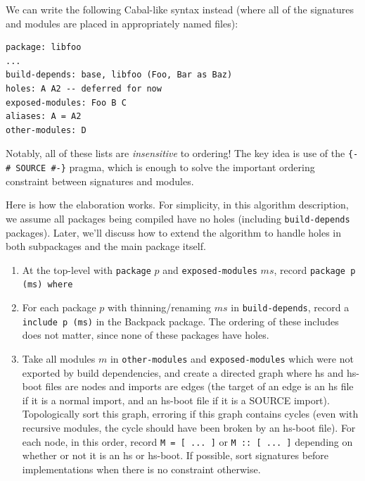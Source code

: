 \documentclass{article}
\begin{document}
We can write the following Cabal-like syntax instead (where
all of the signatures and modules are placed in appropriately
named files):

\begin{verbatim}
package: libfoo
...
build-depends: base, libfoo (Foo, Bar as Baz)
holes: A A2 -- deferred for now
exposed-modules: Foo B C
aliases: A = A2
other-modules: D
\end{verbatim}

Notably, all of these lists are \emph{insensitive} to ordering!
The key idea is use of the \verb|{-# SOURCE #-}| pragma, which
is enough to solve the important ordering constraint between
signatures and modules.

Here is how the elaboration works.  For simplicity, in this algorithm
description, we assume all packages being compiled have no holes
(including \verb|build-depends| packages). Later, we'll discuss how to
extend the algorithm to handle holes in both subpackages and the main
package itself.

\begin{enumerate}

    \item At the top-level with \verb|package| $p$ and
        \verb|exposed-modules| $ms$, record \verb|package p (ms) where|

    \item For each package $p$ with thinning/renaming $ms$ in
        \verb|build-depends|, record a \verb|include p (ms)| in the
        Backpack package.  The ordering of these includes does not
        matter, since none of these packages have holes.

    \item Take all modules $m$ in \verb|other-modules| and
        \verb|exposed-modules| which were not exported by build
        dependencies, and create a directed graph where hs and hs-boot
        files are nodes and imports are edges (the target of an edge is
        an hs file if it is a normal import, and an hs-boot file if it
        is a SOURCE import).  Topologically sort this graph, erroring if
        this graph contains cycles (even with recursive modules, the
        cycle should have been broken by an hs-boot file).  For each
        node, in this order, record \verb|M = [ ... ]| or \verb|M :: [ ... ]|
        depending on whether or not it is an hs or hs-boot.  If possible,
        sort signatures before implementations when there is no constraint
        otherwise.

\end{enumerate}
\end{document}
